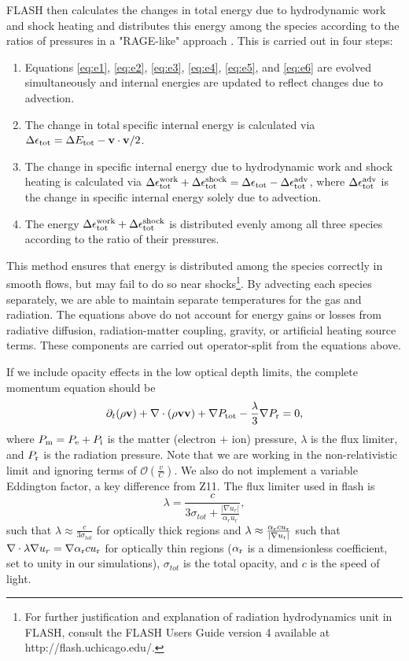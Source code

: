 \documentclass[preprint,11pt]{aastex}
\newcommand{\beq}{\begin{equation}}
\newcommand{\eeq}{\end{equation}}
\begin{document}
FLASH then calculates the changes in total energy due to hydrodynamic work and shock heating and distributes this energy among the species according to the ratios of pressures in a "RAGE-like" approach \citep{Gittings:08}.  This is carried out in four steps:
\begin{enumerate}
  \item Equations \ref{eq:e1}, \ref{eq:e2}, \ref{eq:e3}, \ref{eq:e4}, \ref{eq:e5}, and \ref{eq:e6} are evolved simultaneously and internal energies are updated to reflect changes due to advection.
  \item The change in total specific internal energy is calculated via $\Delta \epsilon_{\rm tot} = \Delta E_{\rm tot} - \mathbf{v} \cdot \mathbf{v} / 2$.
  \item The change in specific internal energy due to hydrodynamic work and shock heating is calculated via $\Delta \epsilon^{\rm work}_{\rm tot} + \Delta \epsilon^{\rm shock}_{\rm tot} = \Delta \epsilon_{\rm tot} - \Delta \epsilon_{\rm tot}^{\rm adv}$, where $\Delta \epsilon_{\rm tot}^{\rm adv}$ is the change in specific internal energy solely due to advection.
  \item The energy $\Delta \epsilon^{\rm work}_{\rm tot} + \Delta \epsilon^{\rm shock}_{\rm tot}$ is distributed evenly among all three species according to the ratio of their pressures.
\end{enumerate}
This method ensures that energy is distributed among the species correctly in smooth flows, but may fail to do so near shocks\footnote{For further justification and explanation of radiation hydrodynamics unit in FLASH, consult the FLASH Users Guide version 4 available at http://flash.uchicago.edu/.}.  By advecting each species separately, we are able to maintain separate temperatures for the gas and radiation.  The equations above do not account for energy gains or losses from radiative diffusion, radiation-matter coupling, gravity, or artificial heating source terms.  These components are carried out operator-split from the equations above.

If we include opacity effects in the low optical depth limits, the complete momentum equation should be
{\color{blue}
\beq
\label{eq:newmom}
\partial_t (\rho\mathbf{v}) + \nabla \cdot (\rho\mathbf{v}\mathbf{v}) + \nabla P_{\rm tot} - \frac{\lambda}{3} \nabla P_{\rm r}= 0,
\eeq
}
where $P_{\rm m} = P_{\rm e} + P_{\rm i}$ is the matter (electron $+$ ion) pressure, $\lambda$ is the flux limiter, and $P_{\rm r}$ is the radiation pressure.  Note that we are working in the non-relativistic limit and ignoring terms of $\mathcal{O}(\frac{v}{C})$.  We also do not implement a variable Eddington factor, a key difference from Z11.  The flux limiter used in flash is
\beq
\lambda = \frac{c}{3\sigma_{tot} + \frac{|\nabla u_{r}|}{\alpha_r u_{r}}},
\eeq
such that $\lambda \approx \frac{c}{3\sigma_{tot}}$ for optically thick regions and $\lambda \approx \frac{\alpha_{\rm r} c u_{\rm r}}{|\nabla u_{\rm r} |}$  such that $\nabla\cdot \lambda \nabla u_{r} = \nabla \alpha_{\rm r} c u_{\rm r}$ for optically thin regions ($\alpha_{\rm r}$ is a dimensionless coefficient, set to unity in our simulations), $\sigma_{tot}$ is the total opacity, and $c$ is the speed of light.
\end{document}
